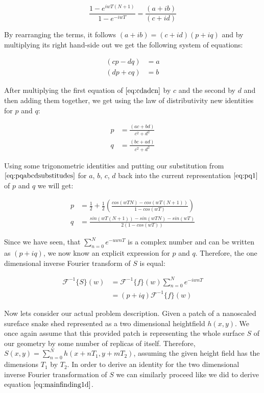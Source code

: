 \begin{equation}
  \frac{1-e^{iwT(N+1)}}{1-e^{-iwT}} = \frac{(a+ib)}{(c+id)}
\end{equation}

By rearranging the terms, it follows $(a+ib) = (c+id)(p+iq)$ and by multiplying its right hand-side out we get the following system of equations:

\begin{align}
(cp-dq)& =a \nonumber \\
(dp + cq)& =b
\label{eq:cdadcn}
\end{align}

After multiplying the first equation of $\ref{eq:cdadcn}$ by $c$ and the second by $d$ and then adding them together, we get using the law of distributivity new identities for $p$ and $q$:

\begin{align}
p& =\frac{(ac+bd)}{c^2 + d^2} \nonumber \\
q& =\frac{(bc+ad)}{c^2 + d^2}
\label{eq:pq1}
\end{align}

Using some trigonometric identities and putting our substitution from $\ref{eq:pqabcdsubstitudes}$ for $a$, $b$, $c$, $d$ back into the current representation $\ref{eq:pq1}$ of $p$ and $q$ we will get:

\begin{align}
p& =\frac{1}{2}+\frac{1}{2}\left(\frac{cos(wTN)-cos(wT(N+1))}{1-cos(wT)}\right) \nonumber \\
q& =\frac{sin(wT(N+1))-sin(wTN)-sin(wT)}{2(1-cos(wT))}
\end{align}

Since we have seen, that $\sum_{n=0}^N e^{-uwnT}$ is a complex number and can be written as $(p+iq)$, we now know an explicit expression for $p$ and $q$. Therefore, the one dimensional inverse Fourier transform of $S$ is equal:

\begin{align}
\mathcal{F}^{-1}\{S\}(w)
& =\mathcal{F}^{-1}\{f\}(w) \sum_{n=0}^{N} e^{-iwnT} \nonumber \\
& = (p+iq) \mathcal{F}^{-1}\{f\}(w)  
\label{eq:mainfinding1d}
\end{align}


Now lets consider our actual problem description. Given a patch of a nanoscaled sureface snake shed represented as a two dimensional heightfield $h(x,y)$. We once again assume that this provided patch is representing the whole surface $S$ of our geometry by some number of replicas of itself. Therefore, $S(x,y) = \sum_{n=0}^{N} h(x+nT_1, y+mT_2)$, assuming the given height field has the dimensions $T_1$ by $T_2$. In order to derive an identity for the two dimensional inverse Fourier transformation of $S$ we can similarly proceed like we did to derive equation $\ref{eq:mainfinding1d}$.

